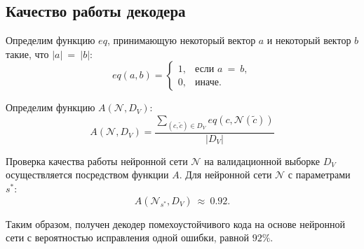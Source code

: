 \subsection{Качество работы декодера}\label{subsec:accuracy}

Определим функцию $eq$, принимающую некоторый вектор $a$ и некоторый вектор $b$ такие, что $|a|~=~|b|$:
\begin{equation}\label{eq:equal}
    eq(a, b) =
    \begin{cases}
        1, & \mbox{если } a~=~b, \\
        0, & \mbox{иначе}.
    \end{cases}
\end{equation}

Определим функцию $A(\mathcal{N}, D_V)$:
\begin{equation}\label{eq:accuracy}
    A(\mathcal{N}, D_V) = \frac{\sum\limits_{(c, \widetilde{c})\in D_V}eq(c, \mathcal{N}(\widetilde{c}))}{|D_V|}
\end{equation}

Проверка качества работы нейронной сети $\mathcal{N}$ на валидационной выборке $D_V$ осуществляется посредством функции $A$. Для нейронной сети $\mathcal{N}$ с параметрами $s^*$:
\begin{equation}\label{eq:final_accuracy}
  A(\mathcal{N}_{s^*}, D_V)~\approx~0.92.
\end{equation}

Таким образом, получен декодер помехоустойчивого кода на основе нейронной сети с вероятностью исправления одной ошибки, равной $92 \%$.
